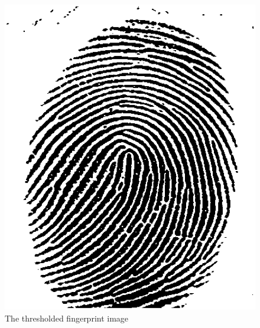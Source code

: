 \begin{figure}[htb]
 \centering
 \includegraphics[width=\linewidth]{segmented_fingerprint.eps}
 \caption{The thresholded fingerprint image}
 \label{fig:segmented_fingerprint}
\end{figure}
\clearpage